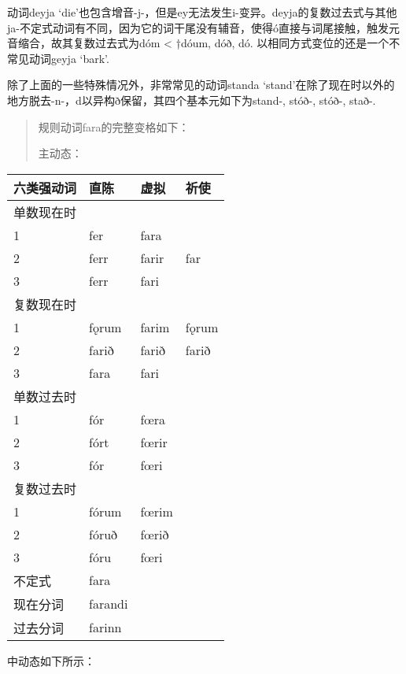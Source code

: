 动词deyja
`die'也包含增音-j-，但是ey无法发生i-变异。deyja的复数过去式与其他ja-不定式动词有不同，因为它的词干尾没有辅音，使得ó直接与词尾接触，触发元音缩合，故其复数过去式为dóm
\textless{} †dóum, dóð, dó. 以相同方式变位的还是一个不常见动词geyja
`bark'.

除了上面的一些特殊情况外，非常常见的动词standa
`stand‌'在除了现在时以外的地方脱去-n-，d以异构ð保留，其四个基本元如下为stand-,
stóð-, stóð-, stað-.

\begin{quote}
  规则动词fara的完整变格如下：

  主动态：
\end{quote}

\begin{longtable}{llll}
  \toprule
  六类强动词 & 直陈    & 虚拟  & 祈使  \\
  \midrule
  \endhead
  \bottomrule
  \endfoot
  单数现在时 &         &       &       \\
  1          & fer     & fara  &       \\
  2          & ferr    & farir & far   \\
  3          & ferr    & fari  &       \\
  复数现在时 &         &       &       \\
  1          & fǫrum   & farim & fǫrum \\
  2          & farið   & farið & farið \\
  3          & fara    & fari  &       \\
  单数过去时 &         &       &       \\
  1          & fór     & fœra  &       \\
  2          & fórt    & fœrir &       \\
  3          & fór     & fœri  &       \\
  复数过去时 &         &       &       \\
  1          & fórum   & fœrim &       \\
  2          & fóruð   & fœrið &       \\
  3          & fóru    & fœri  &       \\
  不定式     & fara    &       &       \\
  现在分词   & farandi &       &       \\
  过去分词   & farinn  &       &       \\
\end{longtable}

中动态如下所示：

